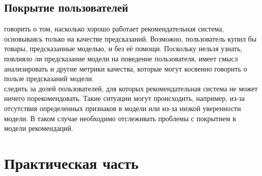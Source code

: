 \documentclass{article}
\newcommand\tab[1][1cm]{\hspace*{#1}}
\begin{document}
\subsection{Покрытие пользователей}
 говорить о том, насколько хорошо работает рекомендательная система,
основываясь только на качестве предсказаний. Возможно, пользователь купил бы
товары, предсказанные моделью, и без её помощи. Поскольку нельзя узнать, повлияло ли предсказание модели на поведение пользователя, имеет смысл анализировать
и другие метрики качества, которые могут косвенно говорить о пользе предсказаний
модели.\\
 следить за долей пользователей, для которых рекомендательная система
не может ничего порекомендовать. Такие ситуации могут происходить, например,
из-за отсутствия определенных признаков в модели или из-за низкой уверенности
модели. В таком случае необходимо отслеживать проблемы с покрытием в модели
рекомендаций.\\
\newpage
\section{Практическая часть}
\end{document}
